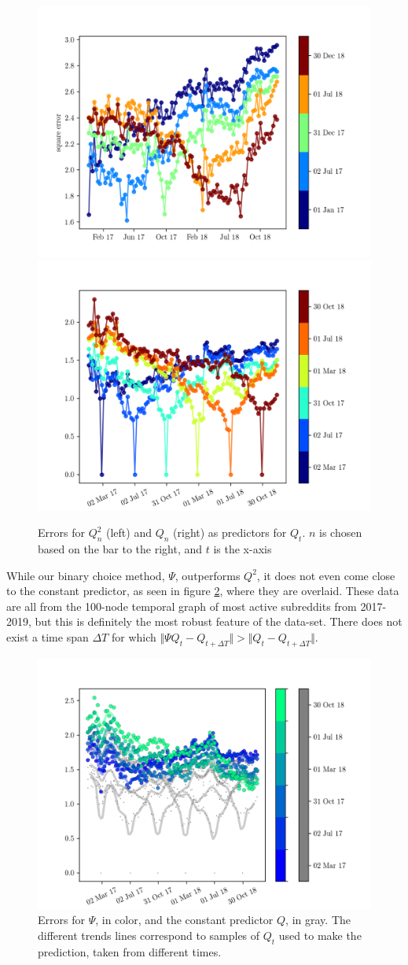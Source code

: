 \documentclass{article}
\theoremstyle{definition}
\begin{document}
	\begin{figure}[h]
		\centering
		\includegraphics[width=0.49\linewidth]{figs/t_vs_err/Q2}
		\includegraphics[width=0.49\linewidth]{figs/t_vs_err/Q_id}
		\caption{\color{darkgray} Errors for $Q_n^2$ (left) and $Q_n$ (right) as predictors for $Q_t$. $n$ is chosen based on the bar to the right, and $t$ is the x-axis}\label{fig:constgood}
	\end{figure}
	
	While our binary choice method, $\Psi$, outperforms $Q^2$, it does not even come close to the constant predictor, as seen in figure \ref{fig:static_v_choice}, where they are overlaid. These data are all from the 100-node temporal graph of most active subreddits from 2017-2019, but this is definitely the most robust feature of the data-set. There does not exist a time span $\Delta T$ for which $\Vert\Psi Q_t - Q_{t + \Delta T}\Vert > \Vert Q_t - Q_{t + \Delta T}\Vert$.
	
		
	\begin{figure}[h!]
		\centering
		\includegraphics[width=0.7\linewidth]{figs/t_vs_err/choice_vs_static2.png}
		\caption{\color{darkgray} Errors for $\Psi$, in color, and the constant predictor $Q$, in gray. The different trends lines correspond to samples of $Q_t$ used to make the prediction, taken from different times.} \label{fig:static_v_choice}
	\end{figure}
\end{document}

